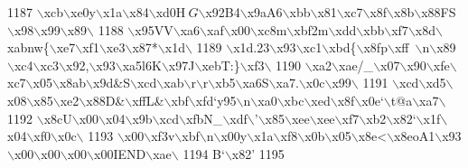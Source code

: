 \begin{DoxyCode}
1187 \textcolor{stringliteral}{\(\backslash\)xcb\(\backslash\)xe0y\(\backslash\)x1a\(\backslash\)x84\(\backslash\)xd0H$~G$\(\backslash\)x92B4\(\backslash\)x9aA6\(\backslash\)xbb\(\backslash\)x81\(\backslash\)xc7\(\backslash\)x8f\(\backslash\)x8b\(\backslash\)x88FS\(\backslash\)x98\(\backslash\)x99\(\backslash\)x89\(\backslash\)}
1188 \textcolor{stringliteral}{\(\backslash\)x95VV\(\backslash\)xa6\(\backslash\)xaf\(\backslash\)x00\(\backslash\)xc8m\(\backslash\)xbf2m\(\backslash\)xdd\(\backslash\)xbb\(\backslash\)xf7\(\backslash\)x8d\(\backslash\)xabnw\{\(\backslash\)xe7\(\backslash\)xf1\(\backslash\)xe3\(\backslash\)x87*\(\backslash\)x1d\(\backslash\)}
1189 \textcolor{stringliteral}{\(\backslash\)x1d.23\(\backslash\)x93\(\backslash\)xc1\(\backslash\)xbd\{\(\backslash\)x8fp\(\backslash\)xff~\(\backslash\)n\(\backslash\)x89\(\backslash\)xc4\(\backslash\)xc3\(\backslash\)x92,\(\backslash\)x93\(\backslash\)xa5l6K\(\backslash\)x97J\(\backslash\)xebT:\}\(\backslash\)xf3\(\backslash\)}
1190 \textcolor{stringliteral}{\(\backslash\)xa2\(\backslash\)xae/\_\(\backslash\)x07\(\backslash\)x90\(\backslash\)xfe\(\backslash\)xc7\(\backslash\)x05\(\backslash\)x8ab\(\backslash\)x9d&S\(\backslash\)xcd\(\backslash\)xab\(\backslash\)r\(\backslash\)r\(\backslash\)xb5\(\backslash\)xa6S\(\backslash\)xa7.\(\backslash\)x0c\(\backslash\)x99\(\backslash\)}
1191 \textcolor{stringliteral}{\(\backslash\)xcd\(\backslash\)xd5\(\backslash\)x08\(\backslash\)x85\(\backslash\)xe2\(\backslash\)x88D&\(\backslash\)xffL&\(\backslash\)xbf\(\backslash\)xfd`y95\(\backslash\)n\(\backslash\)xa0\(\backslash\)xbc\(\backslash\)xed\(\backslash\)x8f\(\backslash\)x0e`\(\backslash\)t@a\(\backslash\)xa7\(\backslash\)}
1192 \textcolor{stringliteral}{\(\backslash\)x8cU\(\backslash\)x00\(\backslash\)x04\(\backslash\)x9b\(\backslash\)xcd\(\backslash\)xfbN\_\(\backslash\)xdf\(\backslash\)'\(\backslash\)x85\(\backslash\)xee\(\backslash\)xee\(\backslash\)xf7\(\backslash\)xb2\(\backslash\)x82`\(\backslash\)x1f\(\backslash\)x04\(\backslash\)xf0\(\backslash\)x0c\(\backslash\)}
1193 \textcolor{stringliteral}{\(\backslash\)x00\(\backslash\)xf3v\(\backslash\)xbf\(\backslash\)n\(\backslash\)x00y\(\backslash\)x1a\(\backslash\)xf8\(\backslash\)x0b\(\backslash\)x05\(\backslash\)x8e<\(\backslash\)x8eoA1\(\backslash\)x93\(\backslash\)x00\(\backslash\)x00\(\backslash\)x00\(\backslash\)x00IEND\(\backslash\)xae\(\backslash\)}
1194 \textcolor{stringliteral}{B`\(\backslash\)x82'}
1195 
\end{DoxyCode}
\mbox{\label{namespaceimages_a6c329db2429a821439f24528acc6ad29}} 
